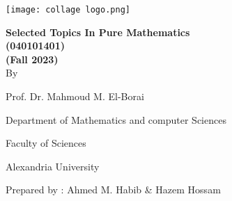 \begingroup
{}
\thispagestyle{empty}
\color{cover}
\begin{center}
    
\end{center}
\endgroup

\newpage
\thispagestyle{empty}

\begingroup
{}
\begin{center}
    \texttt{[image: collage logo.png]}
    \vspace*{1.5cm}
    \par
    {\fontsize{20pt}{30pt}\selectfont
        \textbf{Selected Topics In Pure Mathematics\\(040101401)\\(Fall 2023)}
        \\
        \vspace*{.75cm}
        By
        \vspace*{.75cm}

        Prof. Dr. Mahmoud M. El-Borai

        Department of Mathematics and computer Sciences

        Faculty of Sciences

        Alexandria University
    }

    \vspace*{\fill}
    {\fontsize{10pt}{10pt}\selectfont
    Prepared by : Ahmed M. Habib \& Hazem Hossam
    }
\end{center}
\restoregeometry
\endgroup
\newpage
\tableofcontents
\thispagestyle{empty}
\newpage
\setcounter{page}{1}